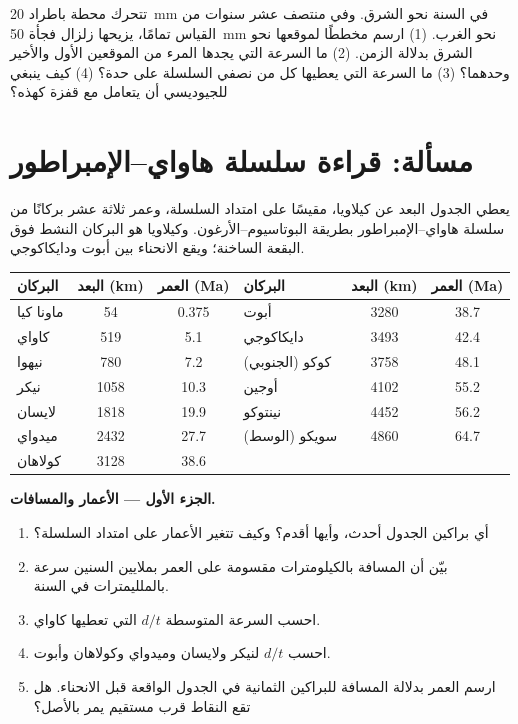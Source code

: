 \begin{exercise}[$\star\star\star$]\label{exo:g11:plate-motions:15}
تتحرك محطة باطراد \qty{20}{mm} في السنة نحو الشرق. وفي منتصف
عشر سنوات من القياس تمامًا، يزيحها زلزال فجأة \qty{50}{mm}
نحو الغرب. (1) ارسم مخططًا لموقعها نحو الشرق بدلالة الزمن. (2) ما السرعة
التي يجدها المرء من الموقعين الأول والأخير وحدهما؟ (3) ما السرعة التي
يعطيها كل من نصفي السلسلة على حدة؟ (4) كيف ينبغي
للجيوديسي أن يتعامل مع قفزة كهذه؟
\end{exercise}

\section{مسألة: قراءة سلسلة هاواي--الإمبراطور}

\begin{problem}
\label{pb:g11:plate-motions:1}
يعطي الجدول البعد عن كيلاويا، مقيسًا على امتداد السلسلة،
وعمر ثلاثة عشر بركانًا من سلسلة هاواي--الإمبراطور بطريقة البوتاسيوم--الأرغون.
وكيلاويا هو البركان النشط فوق البقعة الساخنة؛ ويقع الانحناء بين أبوت
ودايكاكوجي.

\begin{center}
\small
\begin{tabular}{|l|c|c||l|c|c|}
\hline
البركان & البعد (\unit{km}) & العمر (\unit{Ma}) & البركان & البعد (\unit{km}) & العمر (\unit{Ma}) \\ \hline
ماونا كيا & 54 & 0.375 & أبوت & 3280 & 38.7 \\ \hline
كاواي & 519 & 5.1 & دايكاكوجي & 3493 & 42.4 \\ \hline
نيهوا & 780 & 7.2 & كوكو (الجنوبي) & 3758 & 48.1 \\ \hline
نيكر & 1058 & 10.3 & أوجين & 4102 & 55.2 \\ \hline
لايسان & 1818 & 19.9 & نينتوكو & 4452 & 56.2 \\ \hline
ميدواي & 2432 & 27.7 & سويكو (الوسط) & 4860 & 64.7 \\ \hline
كولاهان & 3128 & 38.6 & & & \\ \hline
\end{tabular}
\end{center}

\medskip
\noindent\textbf{الجزء الأول --- الأعمار والمسافات.}
\begin{enumerate}
  \item أي براكين الجدول أحدث، وأيها أقدم؟ وكيف
        تتغير الأعمار على امتداد السلسلة؟
  \item بيّن أن المسافة بالكيلومترات مقسومة على العمر بملايين
        السنين سرعة بالملليمترات في السنة.
  \item احسب السرعة المتوسطة $d/t$ التي تعطيها كاواي.
  \item احسب $d/t$ لنيكر ولايسان وميدواي وكولاهان وأبوت.
  \item ارسم العمر بدلالة المسافة للبراكين الثمانية في
        الجدول الواقعة قبل الانحناء. هل تقع النقاط قرب مستقيم يمر
        بالأصل؟
\end{enumerate}


\end{problem}
